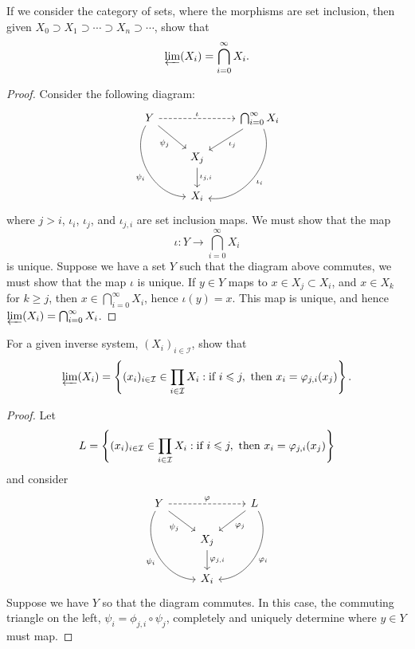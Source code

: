 \documentclass{ximera}
\begin{document}
\begin{example}
  If we consider the category of sets, where the morphisms are set
  inclusion, then given $X_0\supset X_1\supset \cdots \supset
  X_n\supset \cdots$, show that
  \[
  \varprojlim(X_i) = \bigcap_{i=0}^\infty X_i.
  \]
  \begin{proof}
    Consider the following diagram:
    \[
    \begin{tikzcd}
      Y\ar[ddr,bend right=60,swap,"\psi_i"] \ar[dr,swap,"\psi_j"]  \ar[dashed,rr,"\iota"] &   &  \bigcap_{i=0}^\infty X_{i} \ar[ddl,bend left=60,"\iota_i"] \ar[dl,"\iota_j"]\\
      & X_{j} \ar[d,"\iota_{j,i}"] &\\
      & X_{i}&
    \end{tikzcd}
    \]
    where $j>i$, $\iota_i$, $\iota_j$, and $\iota_{j,i}$ are set
    inclusion maps.  We must show that the map
    \[
    \iota: Y \to \bigcap_{i=0}^\infty X_i
    \]
    is unique.  Suppose we have a set $Y$ such that the diagram above
    commutes, we must show that the map $\iota$ is unique.  If $y\in
    Y$ maps to $x\in X_j\subset X_i$, and $x\in X_k$ for $k\ge j$,
    then $x\in\bigcap_{i=0}^\infty X_i$, hence $\iota(y) = x$. This
    map is unique, and hence $\varprojlim(X_i) = \bigcap_{i=0}^\infty
    X_i$.
  \end{proof}
\end{example}



\begin{example}
  For a given inverse system, $(X_i)_{i\in \mathcal{I}}$,
  show that
  \[
  \varprojlim(X_i) = \left\{(x_i)_{i\in \mathcal{I}}\in
  \prod_{i\in \mathcal{I}} X_i:\text{if }i\leqslant j,\text{ then }x_i =
  \varphi_{j,i}(x_j) \right\}.
  \]
  \begin{proof}
    Let
    \[
    L =
    \left\{(x_i)_{i\in \mathcal{I}}\in \prod_{i\in \mathcal{I}} X_i:\text{if }i\leqslant j,\text{ then }x_i = \varphi_{j,i}(x_j) \right\}
    \]
    and consider
    \[
    \begin{tikzcd}
      Y\ar[ddr,bend right=60,swap,"\psi_i"] \ar[dr,swap,"\psi_j"]  \ar[dashed,rr,"\ph"] &   &  L \ar[ddl,bend left=60,"\ph_i"] \ar[dl,"\ph_j"]\\
      & X_{j} \ar[d,"\ph_{j,i}"] &\\
      & X_{i}&
    \end{tikzcd}
    \]
    Suppose we have $Y$ so that the diagram commutes. In this case,
    the commuting triangle on the left, $\psi_i =
    \phi_{j,i}\circ\psi_j$, completely and uniquely determine where
    $y\in Y$ must map.
  \end{proof}
\end{example}
\end{document}
